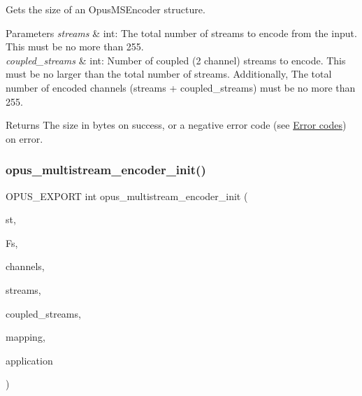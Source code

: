 Gets the size of an Opus\+M\+S\+Encoder structure. 
\begin{DoxyParams}{Parameters}
{\em streams} & {\ttfamily int}\+: The total number of streams to encode from the input. This must be no more than 255. \\
\hline
{\em coupled\+\_\+streams} & {\ttfamily int}\+: Number of coupled (2 channel) streams to encode. This must be no larger than the total number of streams. Additionally, The total number of encoded channels ({\ttfamily streams + coupled\+\_\+streams}) must be no more than 255. \\
\hline
\end{DoxyParams}
\begin{DoxyReturn}{Returns}
The size in bytes on success, or a negative error code (see \hyperlink{group__opus__errorcodes}{Error codes}) on error. 
\end{DoxyReturn}
\mbox{\label{group__opus__multistream_gaf9045180b3a93d7cc3d1197859b767a8}} 
\subsubsection{\texorpdfstring{opus\+\_\+multistream\+\_\+encoder\+\_\+init()}{opus\_multistream\_encoder\_init()}}
{\footnotesize\ttfamily O\+P\+U\+S\+\_\+\+E\+X\+P\+O\+RT int opus\+\_\+multistream\+\_\+encoder\+\_\+init (\begin{DoxyParamCaption}\item[{\hyperlink{group__opus__multistream_gae5826674d142fc873ebc1d781c507dd7}{Opus\+M\+S\+Encoder} $\ast$}]{st,  }\item[{\hyperlink{opus__types_8h_aa4d309d6f80b99dbabebc8f98879ab9a}{opus\+\_\+int32}}]{Fs,  }\item[{int}]{channels,  }\item[{int}]{streams,  }\item[{int}]{coupled\+\_\+streams,  }\item[{\hyperlink{zconf_8h_a2c212835823e3c54a8ab6d95c652660e}{const} unsigned char $\ast$}]{mapping,  }\item[{int}]{application }\end{DoxyParamCaption})}

